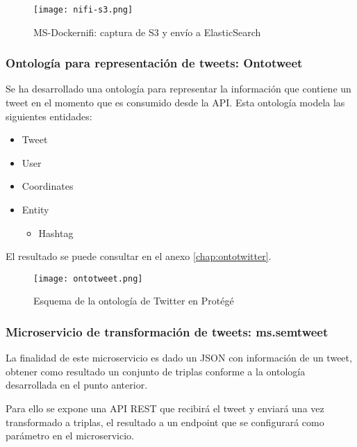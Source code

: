 \begin{figure}[!h]
  \begin{center}
    \texttt{[image: nifi-s3.png]} 
    \caption{MS-Dockernifi: captura de S3 y envío a ElasticSearch}
    \label{fig:nifi-s3}
  \end{center}
\end{figure}


\subsubsection{Ontología para representación de tweets: Ontotweet}

Se ha desarrollado una ontología para representar la información que contiene un
tweet en el momento que es consumido desde la \acs{API}. Esta ontología modela
las siguientes entidades: 

\begin{itemize}
\item Tweet
\item User
\item Coordinates
\item Entity
  \begin{itemize}
  \item Hashtag
  \end{itemize}
\end{itemize}

El resultado se puede consultar en el anexo \ref{chap:ontotwitter}.

\begin{figure}[!h]
  \begin{center}
    \texttt{[image: ontotweet.png]} 
    \caption{Esquema de la ontología de Twitter en Protégé}
    \label{fig:ontotwitterprotege}
  \end{center}
\end{figure}

\subsubsection{Microservicio de transformación de tweets: ms.semtweet}

La finalidad de este microservicio es dado un \acs{JSON} con información de un
tweet, obtener como resultado un conjunto de triplas conforme a la ontología
desarrollada en el punto anterior.

Para ello se expone una \acs{API} \acs{REST} que recibirá el tweet y enviará una
vez transformado a triplas, el resultado a un endpoint que se configurará como
parámetro en el microservicio. 

